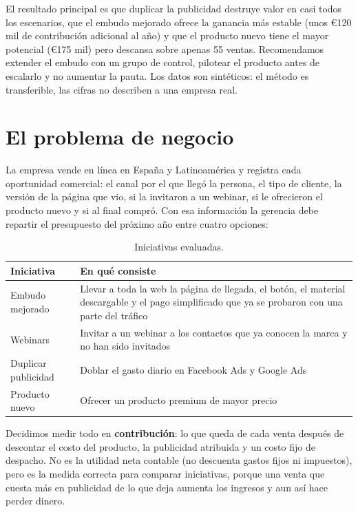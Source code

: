 \documentclass[11pt,letterpaper]{article}
\begin{document}
El resultado principal es que duplicar la publicidad destruye valor en casi todos los escenarios, que el
embudo mejorado ofrece la ganancia más estable (unos €120 mil de contribución adicional al año) y que el
producto nuevo tiene el mayor potencial (€175 mil) pero descansa sobre apenas 55 ventas. Recomendamos
extender el embudo con un grupo de control, pilotear el producto antes de escalarlo y no aumentar la pauta.
Los datos son sintéticos: el método es transferible, las cifras no describen a una empresa real.

\newpage
{\small\setlength{\parskip}{0.15em}\tableofcontents}
\newpage

\section{El problema de negocio}

La empresa vende en línea en España y Latinoamérica y registra cada oportunidad comercial: el canal por el que
llegó la persona, el tipo de cliente, la versión de la página que vio, si la invitaron a un webinar, si le
ofrecieron el producto nuevo y si al final compró. Con esa información la gerencia debe repartir el presupuesto
del próximo año entre cuatro opciones:

\begin{table}[!htbp]
\centering
\caption{Iniciativas evaluadas.}
\begin{tabularx}{\linewidth}{l L}
\toprule
Iniciativa & En qué consiste \\
\midrule
Embudo mejorado & Llevar a toda la web la página de llegada, el botón, el material descargable y el pago
simplificado que ya se probaron con una parte del tráfico \\
Webinars & Invitar a un webinar a los contactos que ya conocen la marca y no han sido invitados \\
Duplicar publicidad & Doblar el gasto diario en Facebook Ads y Google Ads \\
Producto nuevo & Ofrecer un producto premium de mayor precio \\
\bottomrule
\end{tabularx}
\end{table}

Decidimos medir todo en \textbf{contribución}: lo que queda de cada venta después de descontar el costo del
producto, la publicidad atribuida y un costo fijo de despacho. No es la utilidad neta contable (no descuenta
gastos fijos ni impuestos), pero es la medida correcta para comparar iniciativas, porque una venta que cuesta
más en publicidad de lo que deja aumenta los ingresos y aun así hace perder dinero.
\end{document}
